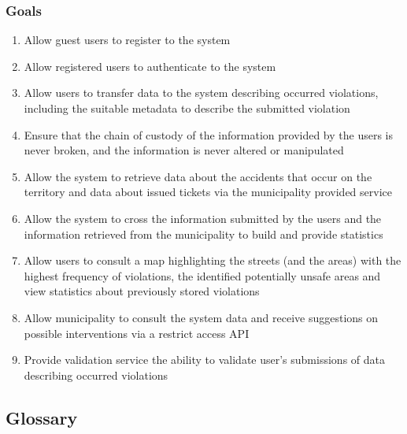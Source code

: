 \subsubsection{Goals}
	\label{sec:goals}
	\begin{enumerate}[label=\textbf{G\arabic*}]
		\item \label{goal:register} Allow guest users to register to the system
		\item \label{goal:login} Allow registered users to authenticate to the system
		\item \label{goal:userTransfer} Allow users to transfer data to the system describing occurred violations, including the suitable metadata to describe the submitted violation
		\item \label{goal:avoidLeaks} Ensure that the chain of custody of the information provided by the users is never broken, and the information is never altered or manipulated
		\item \label{goal:municipalityTransfer} Allow the system to retrieve data about the accidents that occur on the territory and data about issued tickets via the municipality provided service
		\item \label{goal:statistics} Allow the system to cross the information submitted by the users and the information retrieved from the municipality to build and provide statistics
		\item \label{goal:consultMap} Allow users to consult a map highlighting the streets (and the areas) with the highest frequency of violations, the identified potentially unsafe areas and view statistics about previously stored violations
		\item \label{goal:retrieveData} Allow municipality to consult the system data and receive suggestions on possible interventions via a restrict access API
		\item \label{goal:operator} Provide validation service the ability to validate user's submissions of data describing occurred violations

	\end{enumerate}

\subsection{Glossary}
